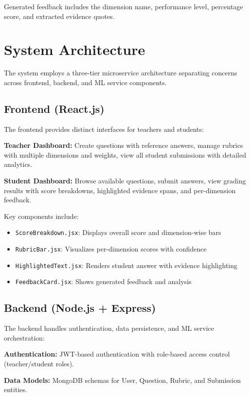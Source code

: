 \documentclass[conference]{IEEEtran}
\begin{document}
Generated feedback includes the dimension name, performance level, percentage score, and extracted evidence quotes.

\section{System Architecture}
The system employs a three-tier microservice architecture separating concerns across frontend, backend, and ML service components.

\subsection{Frontend (React.js)}
The frontend provides distinct interfaces for teachers and students:

\textbf{Teacher Dashboard:} Create questions with reference answers, manage rubrics with multiple dimensions and weights, view all student submissions with detailed analytics.

\textbf{Student Dashboard:} Browse available questions, submit answers, view grading results with score breakdowns, highlighted evidence spans, and per-dimension feedback.

Key components include:
\begin{itemize}
    \item \texttt{ScoreBreakdown.jsx}: Displays overall score and dimension-wise bars
    \item \texttt{RubricBar.jsx}: Visualizes per-dimension scores with confidence
    \item \texttt{HighlightedText.jsx}: Renders student answer with evidence highlighting
    \item \texttt{FeedbackCard.jsx}: Shows generated feedback and analysis
\end{itemize}

\subsection{Backend (Node.js + Express)}
The backend handles authentication, data persistence, and ML service orchestration:

\textbf{Authentication:} JWT-based authentication with role-based access control (teacher/student roles).

\textbf{Data Models:} MongoDB schemas for User, Question, Rubric, and Submission entities.
\end{document}
